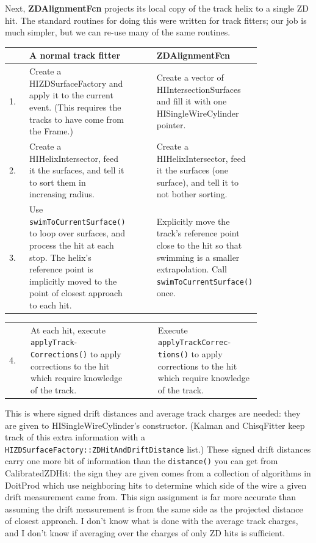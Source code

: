 \documentclass[12pt]{article}
\begin{document}
Next, {\bf ZDAlignmentFcn} projects its local copy of the track helix
to a single ZD hit.  The standard routines for doing this were written
for track fitters; our job is much simpler, but we can re-use many of
the same routines.
\begin{center}
  \begin{tabular}{l p{0.41\linewidth} c | c p{0.41\linewidth}}
    & A normal track fitter & & & {\bf ZDAlignmentFcn} \\\hline
      1.
    &
      Create a HIZDSurfaceFactory and apply it to the current event.
      (This requires the tracks to have come from the Frame.)
    & & &
      Create a vector of HIIntersectionSurfaces and fill it with one
      HISingleWireCylinder pointer.
    \\
      2.
    &
      Create a HIHelixIntersector, feed it the surfaces, and tell it
      to sort them in increasing radius.
    & & &
      Create a HIHelixIntersector, feed it the surfaces (one surface),
      and tell it to not bother sorting.
    \\
      3.
    &
      Use {\tt swimToCurrentSurface()} to loop over surfaces, and
      process the hit at each stop.  The helix's reference point is
      implicitly moved to the point of closest approach to each hit.
    & & &
      Explicitly move the track's reference point close to the hit so
      that swimming is a smaller extrapolation.  Call
      {\tt swimToCurrentSurface()} once.
  \end{tabular}
\end{center}
\begin{center}
  \begin{tabular}{l p{0.41\linewidth} c | c p{0.41\linewidth}}
      4.
    &
      At each hit, execute {\tt applyTrack}- {\tt Corrections()} to apply
      corrections to the hit which require knowledge of the track.
    & & &
      Execute {\tt applyTrackCorrec}- {\tt tions()} to apply corrections to
      the hit which require knowledge of the track.
    \\
  \end{tabular}
\end{center}

This is where signed drift distances and average track charges are
needed: they are given to HISingleWireCylinder's constructor.  (Kalman
and ChisqFitter keep track of this extra information with a
{\tt HIZDSurfaceFactory::ZDHitAndDriftDistance} list.)  These signed
drift distances carry one more bit of information than the
{\tt distance()} you can get from CalibratedZDHit: the sign they are
given comes from a collection of algorithms in DoitProd which use
neighboring hits to determine which side of the wire a given drift
measurement came from.  This sign assignment is far more accurate than
assuming the drift measurement is from the same side as the projected
distance of closest approach.  I don't know what is done with the
average track charges, and I don't know if averaging over the charges
of only ZD hits is sufficient.
\end{document}
